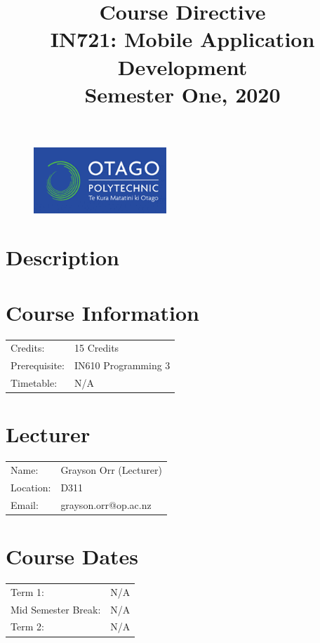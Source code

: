 \documentclass{article}
\author{}
\begin{document}
\begin{figure}
\includegraphics[width=50mm]{../resources/img/logo.png}
\end{figure}

\title{Course Directive\\IN721: Mobile Application Development\\Semester One, 2020}
\date{}
\maketitle

\section*{Description}

\section*{Course Information}
\begin{tabular}{ll}
Credits: & 15 Credits \\
Prerequisite: & IN610 Programming 3 \\
Timetable: & N/A \\
\end{tabular}

\section*{Lecturer}
\begin{tabular}{ll}
Name: & Grayson Orr (Lecturer) \\
Location: & D311 \\
Email: & grayson.orr@op.ac.nz \\
\end{tabular}

\section*{Course Dates}
\begin{tabular}{ll}
Term 1: & N/A \\
Mid Semester Break: & N/A \\
Term 2: & N/A \\
\end{tabular}
\end{document}
